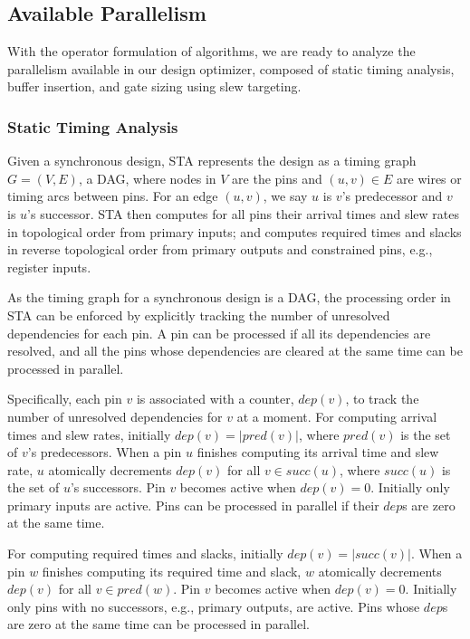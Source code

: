 \subsection{Available Parallelism}
\label{sec:avail_parallelism}

With the operator formulation of algorithms, we are ready to analyze the parallelism available in our design optimizer, composed of static timing analysis, buffer insertion, and gate sizing using slew targeting.

\subsubsection{Static Timing Analysis}
\label{sec:sta_parallel}

Given a synchronous design, STA represents the design as a timing graph $G = (V, E)$, a DAG, where nodes in $V$ are the pins and $(u, v) \in E$ are wires or timing arcs between pins. For an edge $(u, v)$, we say $u$ is $v$'s predecessor and $v$ is $u$'s successor. STA then computes for all pins their arrival times and slew rates in topological order from primary inputs; and computes required times and slacks in reverse topological order from primary outputs and constrained pins, e.g., register inputs.

As the timing graph for a synchronous design is a DAG, the processing order in STA can be enforced by explicitly tracking the number of unresolved dependencies for each pin. A pin can be processed if all its dependencies are resolved, and all the pins whose dependencies are cleared at the same time can be processed in parallel.

Specifically, each pin $v$ is associated with a counter, $dep(v)$, to track the number of unresolved dependencies for $v$ at a moment. For computing arrival times and slew rates, initially $dep(v) = |pred(v)|$, where $pred(v)$ is the set of $v$'s predecessors. When a pin $u$ finishes computing its arrival time and slew rate, $u$ atomically decrements $dep(v)$ for all $v \in succ(u)$, where $succ(u)$ is the set of $u$'s successors. Pin $v$ becomes active when $dep(v) = 0$. Initially only primary inputs are active. Pins can be processed in parallel if their $dep$s are zero at the same time.

For computing required times and slacks, initially $dep(v) = |succ(v)|$. When a pin $w$ finishes computing its required time and slack, $w$ atomically decrements $dep(v)$ for all $v \in pred(w)$. Pin $v$ becomes active when $dep(v) = 0$. Initially only pins with no successors, e.g., primary outputs, are active. Pins whose $dep$s are zero at the same time can be processed in parallel.

